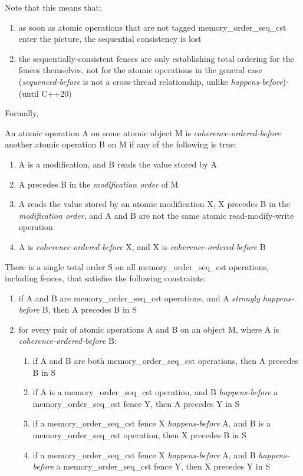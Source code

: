 \documentclass[
]{article}
\begin{document}
Note that this means that:

\begin{enumerate}
\def\labelenumi{\arabic{enumi})}
\item
  as soon as atomic operations that are not tagged
  memory\_order\_seq\_cst enter the picture, the sequential consistency
  is lost
\item
  the sequentially-consistent fences are only establishing total
  ordering for the fences themselves, not for the atomic operations in
  the general case (\emph{sequenced-before} is not a cross-thread
  relationship, unlike \emph{happens-before})-(until C++20)
\end{enumerate}

Formally,

An atomic operation A on some atomic object M is
\emph{coherence-ordered-before} another atomic operation B on M if any
of the following is true:

\begin{enumerate}
\def\labelenumi{\arabic{enumi})}
\item
  A is a modification, and B reads the value stored by A
\item
  A precedes B in the \emph{modification order} of M
\item
  A reads the value stored by an atomic modification X, X precedes B in
  the \emph{modification order}, and A and B are not the same atomic
  read-modify-write operation
\item
  A is \emph{coherence-ordered-before} X, and X is
  \emph{coherence-ordered-before} B
\end{enumerate}

There is a single total order S on all memory\_order\_seq\_cst
operations, including fences, that satisfies the following constraints:

\begin{enumerate}
\def\labelenumi{\arabic{enumi})}
\item
  if A and B are memory\_order\_seq\_cst operations, and A
  \emph{strongly happens-before} B, then A precedes B in S
\item
  for every pair of atomic operations A and B on an object M, where A is
  \emph{coherence-ordered-before} B:

  \begin{enumerate}
  \def\labelenumii{\alph{enumii}.}
  \item
    if A and B are both memory\_order\_seq\_cst operations, then A
    precedes B in S
  \item
    if A is a memory\_order\_seq\_cst operation, and B
    \emph{happens-before} a memory\_order\_seq\_cst fence Y, then A
    precedes Y in S
  \item
    if a memory\_order\_seq\_cst fence X \emph{happens-before} A, and B
    is a memory\_order\_seq\_cst operation, then X precedes B in S
  \item
    if a memory\_order\_seq\_cst fence X \emph{happens-before} A, and B
    \emph{happens-before} a memory\_order\_seq\_cst fence Y, then X
    precedes Y in S
  \end{enumerate}
\end{enumerate}
\end{document}

